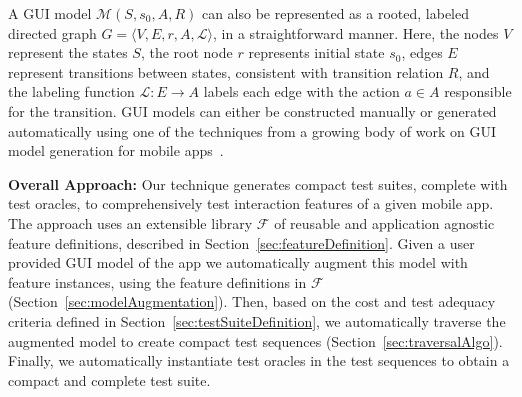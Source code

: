 A GUI model $\mathcal{M}(S, s_0, A, R)$ can also be represented as a rooted, labeled directed graph $G = \langle V, E, r, A, \mathcal{L} \rangle$, in a straightforward manner. Here, the nodes $V$ represent the states $S$, the root node $r$ represents initial state $s_0$, edges $E$ represent transitions between states, consistent with transition relation $R$, and the labeling function $\mathcal{L} \colon E \to A$ labels each edge with the action $a \in A$ responsible for the transition. GUI models can either be constructed manually or generated automatically using one of the techniques from a growing body of work on GUI model generation for mobile apps~\cite{AmalfitanoASE2012, Joorabchi:2012:WCRE, YangFASE2013}.

\textbf{Overall Approach:} 
Our technique generates compact test suites, complete with test oracles, to comprehensively test interaction features of a given mobile app. The approach uses an extensible library $\mathcal{F}$ of reusable and application agnostic feature definitions, described in Section~\ref{sec:featureDefinition}. Given a user provided GUI model of the app we automatically augment this model with feature instances, using the feature definitions in $\mathcal{F}$ (Section~\ref{sec:modelAugmentation}). %
Then, based on the cost and test adequacy criteria defined in Section~\ref{sec:testSuiteDefinition}, we automatically traverse the augmented model to create compact test sequences (Section~\ref{sec:traversalAlgo}). Finally, we automatically instantiate test oracles in the test sequences to obtain a compact and complete test suite.


